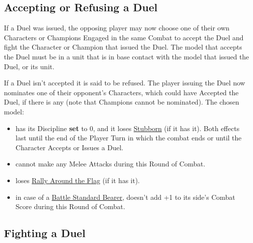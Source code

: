 \subsection{Accepting or Refusing a Duel}
\label{accepting_and_refusing_a_duel}

If a Duel was issued, the opposing player may now choose one of their own Characters or Champions Engaged in the same Combat to accept the Duel and fight the Character or Champion that issued the Duel. The model that accepts the Duel must be in a unit that is in base contact with the model that issued the Duel, or its unit.

If a Duel isn't accepted it is said to be refused. The player issuing the Duel now nominates one of their opponent's Characters, which could have Accepted the Duel, if there is any (note that Champions cannot be nominated). The chosen model:
\begin{itemize}[label={-}]
\item has its Discipline \textbf{set} to 0, and it loses \hyperref[stubborn]{Stubborn} (if it has it). Both effects last until the end of the Player Turn in which the combat ends or until the Character Accepts or Issues a Duel.
\item cannot make any Melee Attacks during this Round of Combat.
\item loses \hyperref[rally_around_the_flag]{Rally Around the Flag} (if it has it).
\item in case of a \hyperref[bsb]{Battle Standard Bearer}, doesn't add +1 to its side's Combat Score during this Round of Combat.
\end{itemize}

\subsection{Fighting a Duel}
\label{fighting_a_duel}

